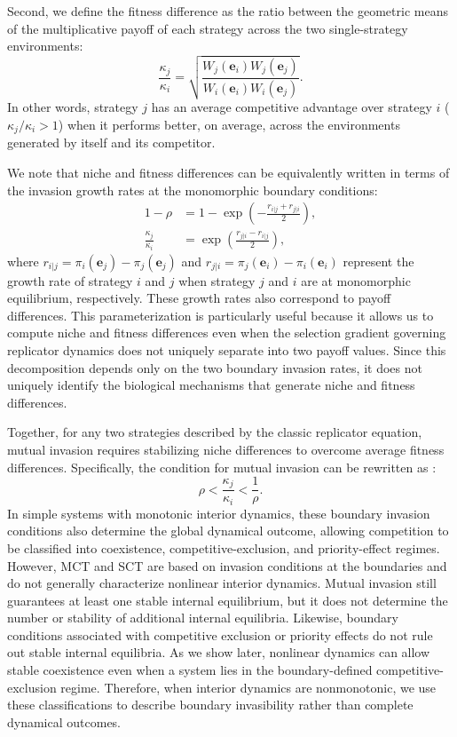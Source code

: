 \documentclass[12pt]{article}
\begin{document}
Second, we define the fitness difference as the ratio between the geometric means of the multiplicative payoff of each strategy across the two single-strategy environments:
\begin{equation}
\frac{\kappa_j}{\kappa_i} = \sqrt{\frac{W_j(\mathbf{e}_i)W_j(\mathbf{e}_j)}{W_i(\mathbf{e}_i) W_i(\mathbf{e}_j)}}.
\end{equation}
In other words, strategy $j$ has an average competitive advantage over strategy $i$ ($\kappa_j/\kappa_i > 1$) when it performs better, on average, across the environments generated by itself and its competitor.

We note that niche and fitness differences can be equivalently written in terms of the invasion growth rates at the monomorphic boundary conditions:
\begin{align}
1- \rho &= 1 - \exp\left(-\frac{r_{i|j} + r_{j|i}}{2} \right),\\
\frac{\kappa_j}{\kappa_i} &= \exp\left(\frac{r_{j|i} - r_{i|j}}{2}\right),
\end{align}
where $r_{i|j} = \pi_i(\mathbf{e}_j) - \pi_j(\mathbf{e}_j)$ and $r_{j|i} = \pi_j(\mathbf{e}_i) - \pi_i(\mathbf{e}_i)$ represent the growth rate of strategy $i$ and $j$ when strategy $j$ and $i$ are at monomorphic equilibrium, respectively.
These growth rates also correspond to payoff differences.
This parameterization is particularly useful because it allows us to compute niche and fitness differences even when the selection gradient governing replicator dynamics does not uniquely separate into two payoff values.
Since this decomposition depends only on the two boundary invasion rates, it does not uniquely identify the biological mechanisms that generate niche and fitness differences.

Together, for any two strategies described by the classic replicator equation, mutual invasion requires stabilizing niche differences to overcome average fitness differences.
Specifically, the condition for mutual invasion can be rewritten as \citep{chesson2000mechanisms}:
\begin{equation}
\rho < \frac{\kappa_j}{\kappa_i} < \frac{1}{\rho}.
\end{equation}
In simple systems with monotonic interior dynamics, these boundary invasion conditions also determine the global dynamical outcome, allowing competition to be classified into coexistence, competitive-exclusion, and priority-effect regimes.
However, MCT and SCT are based on invasion conditions at the boundaries and do not generally characterize nonlinear interior dynamics.
Mutual invasion still guarantees at least one stable internal equilibrium, but it does not determine the number or stability of additional internal equilibria. 
Likewise, boundary conditions associated with competitive exclusion or priority effects do not rule out stable internal equilibria.
As we show later, nonlinear dynamics can allow stable coexistence even when a system lies in the boundary-defined competitive-exclusion regime. 
Therefore, when interior dynamics are nonmonotonic, we use these classifications to describe boundary invasibility rather than complete dynamical outcomes.
\end{document}
